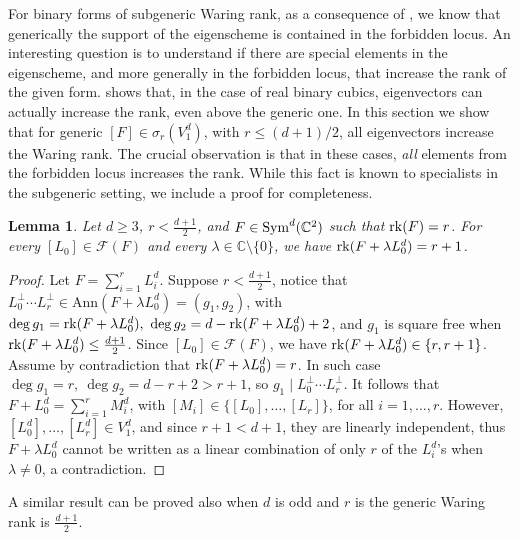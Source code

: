 \documentclass{amsart}
\numberwithin{theorem}{section}
\newtheorem{lemma}[theorem]{Lemma}
\theoremstyle{definition}
\newcommand{\CC}{\mathbb{C}}
\newcommand{\rk}{\mathop{\rm rk}\nolimits}
\newcommand{\sym}{\mathop{\rm Sym}\nolimits}
\begin{document}
For binary forms of subgeneric Waring rank, as a consequence of , we know that generically the support of the eigenscheme is contained in the forbidden locus. An interesting question is to understand if there are special elements in the eigenscheme, and more generally in the forbidden locus, that increase the rank of the given form.
 \cite{SC10} shows that, in the case of real binary cubics, eigenvectors can actually increase the rank, even above the generic one. In this section we show that for generic $[F]\in\sigma_r(V_1^d)$, with $r\leq (d+1)/2$, all eigenvectors increase the Waring rank. The crucial observation is that in these cases, \textit{all} elements from the forbidden locus increases the rank. While this fact is known to specialists in the subgeneric setting, we include a proof for completeness.


\begin{lemma}\label{prop: subgenrkgrow}
    Let $d\geq 3$, $r<\frac{d+1}{2}$, and $F\in \sym^d(\CC^2)$ such that $\rk(F)=r$. For every $[L_0]\in \mathcal F(F)$ and every $\lambda\in\CC\setminus\{0\}$, we have $\rk(F+\lambda L_0^d)=r+1$.
\end{lemma}
\begin{proof}
    Let $F=\sum_{i=1}^rL_i^d$. Suppose $r< \frac{d+1}{2}$, notice that $L_0^\perp\cdots L_r^\perp  \in \mathrm{Ann}(F+\lambda L_0^d)=(g_1,g_2)$, with $\deg g_1=\rk(F+\lambda L_0^d),\ \deg g_2=d-\rk(F+\lambda L_0^d)+2$, and $g_1$ is square free when $\rk(F+\lambda L_0^d)\leq \frac{d+1}{2}$. Since $[L_0]\in\mathcal F(F)$, we have $\rk(F+\lambda L_0^d)\in\{r,r+1\}$. Assume by contradiction that $\rk(F+\lambda L_0^d)=r$. 
    In such case $\deg g_1=r,\ \deg g_2=d-r+2> r+1$, so $g_1\mid L_0^\perp\cdots L_r^\perp $. It follows that $F+L_0^d=\sum_{i=1}^rM_{i}^d$, with $[M_i]\in \{[L_0],\dots,[L_r]\}$, for all $i=1,\dots,r$. However, $[L_0^d],\dots, [L_r^d]\in V_1^d$, and since $r+1<d+1$, they are linearly independent, thus $F+\lambda L_0^d$ cannot be written as a linear combination of only $r$ of the $L_i^d$'s when $\lambda\neq 0$, a contradiction. 
\end{proof}

A similar result can be proved also when $d$ is odd and $r$ is the generic Waring rank is $\frac{d+1}{2}$.
\end{document}
